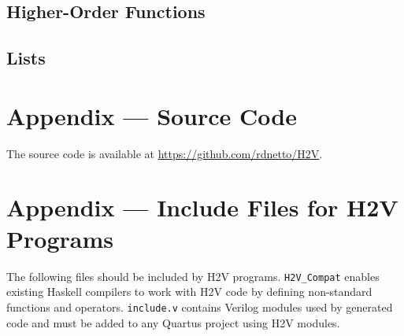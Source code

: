 \documentclass[english,onecolumn]{scrartcl}
\begin{document}
\subsection{Higher-Order Functions}
\label{sec:testHOFunc}

\subsection{Lists}
\label{sec:testList}

\section{Appendix --- Source Code}
The source code is available at \url{https://github.com/rdnetto/H2V}.

\section{Appendix --- Include Files for H2V Programs}
The following files should be included by H2V programs. \texttt{H2V\_Compat} enables existing Haskell compilers to work with H2V
code by defining non-standard functions and operators. \texttt{include.v} contains Verilog modules used by generated code and must
be added to any Quartus project using H2V modules.




\pagebreak{}
\printbibliography
\end{document}
